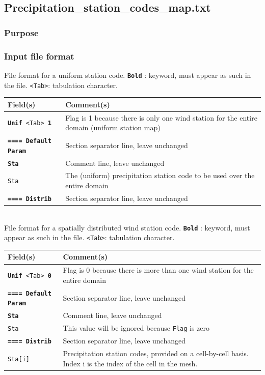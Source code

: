 \subsection{Precipitation\_station\_codes\_map.txt \label{sec:precipStations}}
\subsubsection{Purpose}
%
\subsubsection{Input file format}
%
File format for a uniform station code.  \texttt{\textbf{Bold}} : keyword, must appear as such in the file. \texttt{<Tab>}: tabulation character. \\
    \begin{tabular}{p{6cm} | p{9cm}}
    \hline
    Field(s) & Comment(s) \\
    \hline  \hline
    \texttt{\textbf{Unif} <Tab> \textbf{1}} & Flag is 1 because there is only one wind station for the entire domain (uniform station map) \\ \hline
    \texttt{\textbf{==== Default Param}} & Section separator line, leave unchanged \\  \hline
    \texttt{\textbf{Sta}} & Comment line, leave unchanged \\  \hline
    \texttt{Sta} & The (uniform) precipitation station code to be used over the entire domain \\ \hline
    \texttt{\textbf{==== Distrib}} & Section separator line, leave unchanged \\  \hline
    \end{tabular}
%
\vspace{10mm} \\
%
File format for a spatially distributed wind station code.  \texttt{\textbf{Bold}} : keyword, must appear as such in the file. \texttt{<Tab>}: tabulation character. \\
    \begin{tabular}{p{6cm} | p{9cm}}
    \hline
    Field(s) & Comment(s) \\
    \hline  \hline
    \texttt{\textbf{Unif} <Tab> \textbf{0}} & Flag is 0 because there is more than one wind station for the entire domain \\ \hline
    \texttt{\textbf{==== Default Param}} & Section separator line, leave unchanged \\  \hline
    \texttt{\textbf{Sta}} & Comment line, leave unchanged \\  \hline
    \texttt{Sta} & This value will be ignored because \texttt{Flag} is zero \\ \hline
    \texttt{\textbf{==== Distrib}} & Section separator line, leave unchanged \\  \hline
    \texttt{Sta[i] }  & Precipitation station codes, provided on a cell-by-cell basis. Index i is the index of the cell in the mesh.  \\ \hline
    \end{tabular}
%
